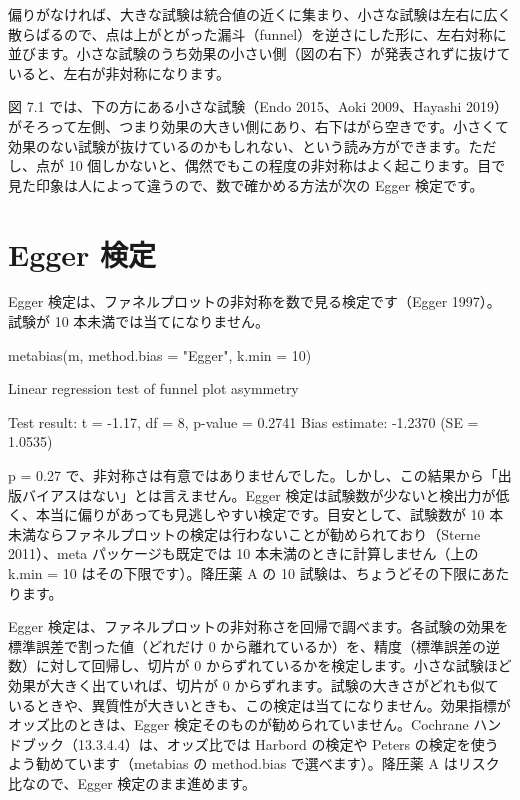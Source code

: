 
偏りがなければ、大きな試験は統合値の近くに集まり、小さな試験は左右に広く散らばるので、点は上がとがった漏斗（funnel）を逆さにした形に、左右対称に並びます。小さな試験のうち効果の小さい側（図の右下）が発表されずに抜けていると、左右が非対称になります。

図 7.1 では、下の方にある小さな試験（Endo 2015、Aoki 2009、Hayashi 2019）がそろって左側、つまり効果の大きい側にあり、右下はがら空きです。小さくて効果のない試験が抜けているのかもしれない、という読み方ができます。ただし、点が 10 個しかないと、偶然でもこの程度の非対称はよく起こります。目で見た印象は人によって違うので、数で確かめる方法が次の Egger 検定です。

\section{Egger 検定}
\label{sec:07-3}

Egger 検定は、ファネルプロットの非対称を数で見る検定です（Egger 1997）。試験が 10 本未満では当てになりません。

\begin{rcode}
metabias(m, method.bias = "Egger", k.min = 10)
\end{rcode}

\begin{rout}
Linear regression test of funnel plot asymmetry

Test result: t = -1.17, df = 8, p-value = 0.2741
Bias estimate: -1.2370 (SE = 1.0535)
\end{rout}

p = 0.27 で、非対称さは有意ではありませんでした。しかし、この結果から「出版バイアスはない」とは言えません。Egger 検定は試験数が少ないと検出力が低く、本当に偏りがあっても見逃しやすい検定です。目安として、試験数が 10 本未満ならファネルプロットの検定は行わないことが勧められており（Sterne 2011）、meta パッケージも既定では 10 本未満のときに計算しません（上の k.min = 10 はその下限です）。降圧薬 A の 10 試験は、ちょうどその下限にあたります。

\begin{hattenbox}
Egger 検定は、ファネルプロットの非対称さを回帰で調べます。各試験の効果を標準誤差で割った値（どれだけ 0 から離れているか）を、精度（標準誤差の逆数）に対して回帰し、切片が 0 からずれているかを検定します。小さな試験ほど効果が大きく出ていれば、切片が 0 からずれます。試験の大きさがどれも似ているときや、異質性が大きいときも、この検定は当てになりません。効果指標がオッズ比のときは、Egger 検定そのものが勧められていません。Cochrane ハンドブック（13.3.4.4）は、オッズ比では Harbord の検定や Peters の検定を使うよう勧めています（metabias の method.bias で選べます）。降圧薬 A はリスク比なので、Egger 検定のまま進めます。
\end{hattenbox}

